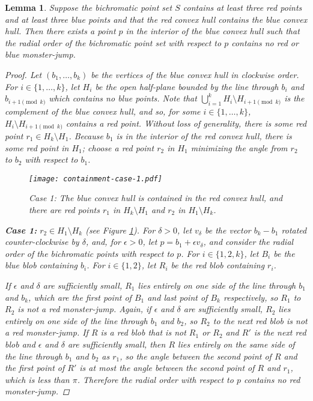 \documentclass[12pt]{article}
\newtheorem{lemma}{Lemma}
\theoremstyle{definition}
\begin{document}
\begin{lemma}
  \label{lem:no-monster-jump-contains}
  Suppose the bichromatic point set $S$ contains at least three red points and at least three blue points and that the red convex hull contains the blue convex hull.
  Then there exists a point $p$ in the interior of the blue convex hull such that the radial order of the bichromatic point set with respect to $p$ contains no red or blue monster-jump.

  \begin{proof}
    Let $(b_1,\ldots,b_k)$ be the vertices of the blue convex hull in clockwise order.
    For $i\in\{1,\ldots,k\}$, let $H_i$ be the open half-plane bounded by the line through $b_i$ and $b_{i+1\pmod{k}}$ which contains no blue points.
    Note that $\bigcup_{i=1}^k H_i\setminus H_{i+1\pmod{k}}$ is the complement of the blue convex hull, and so, for some $i\in\{1,\ldots,k\}$, $H_i\setminus H_{i+1\pmod{k}}$ contains a red point.
    Without loss of generality, there is some red point $r_1\in H_k \setminus H_1$.
    Because $b_1$ is in the interior of the red convex hull, there is some red point in $H_1$; choose a red point $r_2$ in $H_1$ minimizing the angle from $r_2$ to $b_2$ with respect to $b_1$. 

\begin{figure}
\centering
\texttt{[image: containment-case-1.pdf]}
\caption{Case 1: The blue convex hull is contained in the red convex hull, and
there are red points $r_1$ in $H_k\setminus H_1$ and $r_2$ in $H_1\setminus H_k$.}
\label{fig:containment-case-1}
\end{figure}

    \textbf{Case 1:} $r_2\in H_1\setminus H_k$ (see Figure \ref{fig:containment-case-1}). For $\delta>0$, let $v_\delta$ be the vector $b_k-b_1$ rotated counter-clockwise by $\delta$, and, for $\epsilon>0$, let $p=b_1 + \epsilon v_\delta$, and consider the radial order of the bichromatic points with respect to $p$.
    For $i\in\{1,2,k\}$, let $B_i$ be the blue blob containing $b_i$.
    For $i\in\{1,2\}$, let $R_i$ be the red blob containing $r_i$.

    If $\epsilon$ and $\delta$ are sufficiently small, $R_1$ lies entirely on one side of the line through $b_1$ and $b_k$, which are the first point of $B_1$ and last point of $B_k$ respectively, so $R_1$ to $R_2$ is not a red monster-jump.
    Again, if $\epsilon$ and $\delta$ are sufficiently small, $R_2$ lies entirely on one side of the line through $b_1$ and $b_2$, so $R_2$ to the next red blob is not a red monster-jump.
    If $R$ is a red blob that is not $R_1$ or $R_2$ and $R'$ is the next red blob and $\epsilon$ and $\delta$ are sufficiently small, then $R$ lies entirely on the same side of the line through $b_1$ and $b_2$ as $r_1$, so the angle between the second point of $R$ and the first point of $R'$ is at most the angle between the second point of $R$ and $r_1$, which is less than $\pi$.
    Therefore the radial order with respect to $p$ contains no red monster-jump.


\end{proof}
\end{lemma}
\end{document}
